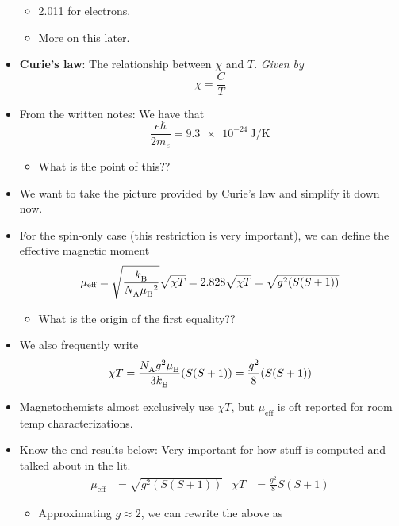 \documentclass[../notes.tex]{subfiles}
\begin{document}
\begin{itemize}
\begin{itemize}
        \item 2.011 for electrons.
        \item More on this later.
    \end{itemize}
    \item \textbf{Curie's law}: The relationship between $\chi$ and $T$. \emph{Given by}
    \begin{equation*}
        \chi = \frac{C}{T}
    \end{equation*}
    \item From the written notes: We have that
    \begin{equation*}
        \frac{e\hbar}{2m_e} = \SI{9.3e-24}{\joule\per\kelvin}
    \end{equation*}
    \begin{itemize}
        \item What is the point of this??
    \end{itemize}
    \item We want to take the picture provided by Curie's law and simplify it down now.
    \item For the spin-only case (this restriction is very important), we can define the effective magnetic moment
    \begin{equation*}
        \mu_\text{eff} = \sqrt{\frac{{k_\text{B}^{}}}{{N_\text{A}^{}}{\mu_\text{B}^{}}^2}}\sqrt{\chi T}
        = 2.828\sqrt{\chi T}
        = \sqrt{g^2(S(S+1))}
    \end{equation*}
    \begin{itemize}
        \item What is the origin of the first equality??
    \end{itemize}
    \item We also frequently write
    \begin{equation*}
        \chi T = \frac{{N_\text{A}^{}} g^2{\mu_\text{B}^{}}}{3{k_\text{B}^{}}}(S(S+1))
        = \frac{g^2}{8}(S(S+1))
    \end{equation*}
    \item Magnetochemists almost exclusively use $\chi T$, but $\mu_\text{eff}$ is oft reported for room temp characterizations.
    \item Know the end results below: Very important for how stuff is computed and talked about in the lit.
    \begin{align*}
        \mu_\text{eff} &= \sqrt{g^2(S(S+1))}&
        \chi T &= \frac{g^2}{8}S(S+1)
    \end{align*}
    \begin{itemize}
        \item Approximating $g\approx 2$, we can rewrite the above as

\end{itemize}
\end{itemize}
\end{document}
